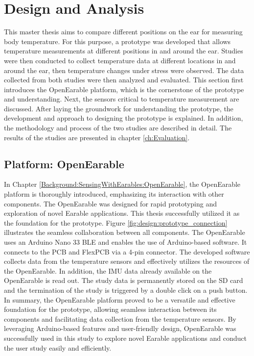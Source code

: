 \chapter{Design and Analysis}
\label{ch:Design}
This master thesis aims to compare different positions on the ear for measuring body temperature. 
For this purpose, a prototype was developed that allows temperature measurements at different positions in and around the ear. 
Studies were then conducted to collect temperature data at different locations in and around the ear, then temperature changes under stress were observed.
The data collected from both studies were then analyzed and evaluated.
This section first introduces the OpenEarable platform, which is the cornerstone of the prototype and understanding. 
Next, the sensors critical to temperature measurement are discussed.
After laying the groundwork for understanding the prototype, the development and approach to designing the prototype is explained.
In addition, the methodology and process of the two studies are described in detail.
The results of the studies are presented in chapter \ref{ch:Evaluation}.

\section{Platform: OpenEarable}
\label{ch:Design:Prototype:OpenEarable}
In Chapter \ref{Background:SensingWithEarables:OpenEarable}, the OpenEarable platform is thoroughly introduced, emphasizing its interaction with other components. 
The OpenEarable was designed for rapid prototyping and exploration of novel Earable applications.
This thesis successfully utilized it as the foundation for the prototype. 
Figure \ref{fig:design:prototype_connection} illustrates the seamless collaboration between all components. 
The OpenEarable uses an Arduino Nano 33 BLE and enables the use of Arduino-based software. It connects to the PCB and FlexPCB via a 4-pin connector. 
The developed software collects data from the temperature sensors and effectively utilizes the resources of the OpenEarable. 
In addition, the IMU data already available on the OpenEarable is read out.
The study data is permanently stored on the SD card and the termination of the study is triggered by a double click on a push button.
In summary, the OpenEarable platform proved to be a versatile and effective foundation for the prototype, allowing seamless interaction between its components and facilitating data collection from the temperature sensors. 
By leveraging Arduino-based features and user-friendly design, OpenEarable was successfully used in this study to explore novel Earable applications and conduct the user study easily and efficiently.

